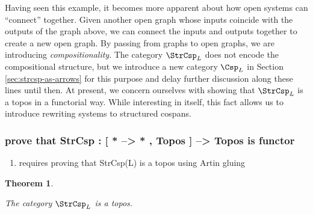 \documentclass{amsart}
\newtheorem{theorem}{Theorem}[section]
\theoremstyle{remark}
\theoremstyle{definition}
\begin{document}

Having seen this example, it becomes more apparent about how open
systems can ``connect'' together. Given another open graph whose inputs
coincide with the outputs of the graph above, we can connect
the inputs and outputs together to create a new open graph. By passing
from graphs to open graphs, we are introducing
\emph{compositionality}. The category $ \StrCsp_{L} $ does not encode
the compositional structure, but we introduce a new category
$ \Csp_L $ in Section \ref{sec:strcsp-as-arrows} for this purpose
and delay further discussion along these lines until then. At present,
we concern ourselves with showing that $ \StrCsp_L $ is a topos in a
functorial way.  While interesting in itself, this fact allows us to
introduce rewriting systems to structured cospans.

\subsubsection{prove that StrCsp : [ * --> * , Topos ] --> Topos is functor}
\label{sec-2-2-4}
\begin{enumerate}
\item requires proving that StrCsp(L) is a topos using Artin gluing
\label{sec-2-2-4-1}
\end{enumerate}

\begin{theorem} \label{thm:strcsp-istopos}

  The category $ \StrCsp_L $ is a topos.
  
\end{theorem}
\end{document}
